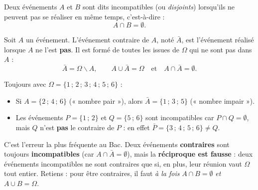 \documentclass[11pt]{article}
\newcommand{\cle}[1]{{\popxbold\color{popdark}#1}}
\def\setminus{\mathbin{\backslash}}\let\smallsetminus\setminus
\begin{document}
\begin{definition}
Deux événements $A$ et $B$ sont dits \cle{incompatibles} (ou \emph{disjoints}) lorsqu'ils ne peuvent pas se réaliser en même temps, c'est-à-dire :
\[ A \cap B = \emptyset. \]
\end{definition}

\begin{definition}
Soit $A$ un événement. L'\cle{événement contraire} de $A$, noté $\bar{A}$, est l'événement réalisé lorsque $A$ ne l'est \textbf{pas}. Il est formé de toutes les issues de $\Omega$ qui ne sont pas dans $A$ :
\[ \bar{A} = \Omega \setminus A, \qquad A \cup \bar{A} = \Omega \quad \text{et} \quad A \cap \bar{A} = \emptyset. \]
\end{definition}

\begin{exemplebox}
Toujours avec $\Omega = \{1\,;\,2\,;\,3\,;\,4\,;\,5\,;\,6\}$ :
\begin{itemize}
\item Si $A = \{2\,;\,4\,;\,6\}$ (« nombre pair »), alors $\bar{A} = \{1\,;\,3\,;\,5\}$ (« nombre impair »).
\item Les événements $P = \{1\,;\,2\}$ et $Q = \{5\,;\,6\}$ sont incompatibles car $P \cap Q = \emptyset$, mais $Q$ n'est \textbf{pas} le contraire de $P$ : en effet $\bar{P} = \{3\,;\,4\,;\,5\,;\,6\} \neq Q$.
\end{itemize}
\end{exemplebox}

\begin{attention}
C'est l'erreur la plus fréquente au Bac. Deux événements \textbf{contraires} sont toujours \textbf{incompatibles} (car $A \cap \bar{A} = \emptyset$), mais la \textbf{réciproque est fausse} : deux événements incompatibles ne sont contraires que si, en plus, leur réunion vaut $\Omega$ tout entier. Retiens : pour être contraires, il faut \emph{à la fois} $A \cap B = \emptyset$ \emph{et} $A \cup B = \Omega$.
\end{attention}
\end{document}
